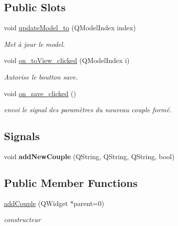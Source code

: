 \subsection*{Public Slots}
\begin{DoxyCompactItemize}
\item 
void \hyperlink{classadd_couple_aa0334cda3e89d32093da234cbd1e8c07}{update\+Model\+\_\+to} (Q\+Model\+Index index)
\begin{DoxyCompactList}\small\item\em Met à jour le model. \end{DoxyCompactList}\item 
void \hyperlink{classadd_couple_af8d724cab931e45a5e68a341fd831aca}{on\+\_\+to\+View\+\_\+clicked} (Q\+Model\+Index i)
\begin{DoxyCompactList}\small\item\em Autorise le boutton save. \end{DoxyCompactList}\item 
\mbox{\label{classadd_couple_ad3a6409a37b17097325d0b65ee1ab15b}} 
void \hyperlink{classadd_couple_ad3a6409a37b17097325d0b65ee1ab15b}{on\+\_\+save\+\_\+clicked} ()
\begin{DoxyCompactList}\small\item\em envoi le signal des paramètres du nouveau couple formé. \end{DoxyCompactList}\end{DoxyCompactItemize}
\subsection*{Signals}
\begin{DoxyCompactItemize}
\item 
\mbox{\label{classadd_couple_a2c807c5516dfa2ff6ecd00622914eb4c}} 
void {\bfseries add\+New\+Couple} (Q\+String, Q\+String, Q\+String, bool)
\end{DoxyCompactItemize}
\subsection*{Public Member Functions}
\begin{DoxyCompactItemize}
\item 
\hyperlink{classadd_couple_a5c478c6e07cd0b9639c4c84687c89764}{add\+Couple} (Q\+Widget $\ast$parent=0)
\begin{DoxyCompactList}\small\item\em constructeur \end{DoxyCompactList}\end{DoxyCompactItemize}


